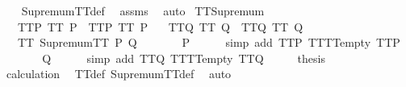 \begin{isabellebody}
%
\isadelimproof
\ \ %
\endisadelimproof
%
\isatagproof
{}\isamarkupfalse%
\ SupremumTT{\isacharunderscore}def\ \isamarkupfalse%
\ assms\ \isamarkupfalse%
\ auto%
\endisatagproof
{\isafoldproof}%
%
\isadelimproof
\isanewline
%
\endisadelimproof
\isanewline
{}\isamarkupfalse%
\ TT{}{\isacharunderscore}Supremum{\isacharcolon}\isanewline
\ \ \ TT{}{\isacharunderscore}P{\isacharcolon}\ {\isachardoublequoteopen}TT{}\ P{\isachardoublequoteclose}\ \ TT{}{\isacharunderscore}P{\isacharcolon}\ {\isachardoublequoteopen}TT{}\ P{\isachardoublequoteclose}\isanewline
\ \ \ TT{}{\isacharunderscore}Q{\isacharcolon}\ {\isachardoublequoteopen}TT{}\ Q{\isachardoublequoteclose}\ \ TT{}{\isacharunderscore}Q{\isacharcolon}\ {\isachardoublequoteopen}TT{}\ Q{\isachardoublequoteclose}\isanewline
\ \ \ {\isachardoublequoteopen}TT{}\ {\isacharparenleft}SupremumTT\ P\ Q{\isacharparenright}{\isachardoublequoteclose}\isanewline
%
\isadelimproof
%
\endisadelimproof
%
\isatagproof
{}\isamarkupfalse%
\ {\isacharminus}\isanewline
\ \ \isamarkupfalse%
\ {\isachardoublequoteopen}{\isacharbrackleft}{\isacharbrackright}\ {\isasymin}\ P{\isachardoublequoteclose}\isanewline
\ \ \ \ \isamarkupfalse%
\ {\isacharparenleft}simp\ add{\isacharcolon}\ TT{}{\isacharunderscore}P\ TT{}{\isacharunderscore}TT{}{\isacharunderscore}empty\ TT{}{\isacharunderscore}P{\isacharparenright}\isanewline
\ \ \isamarkupfalse%
\ \isamarkupfalse%
\ {\isachardoublequoteopen}{\isacharbrackleft}{\isacharbrackright}\ {\isasymin}\ Q{\isachardoublequoteclose}\isanewline
\ \ \ \ \isamarkupfalse%
\ {\isacharparenleft}simp\ add{\isacharcolon}\ TT{}{\isacharunderscore}Q\ TT{}{\isacharunderscore}TT{}{\isacharunderscore}empty\ TT{}{\isacharunderscore}Q{\isacharparenright}\isanewline
\ \ \isamarkupfalse%
\ \isamarkupfalse%
\ {\isacharquery}thesis\isanewline
\ \ \ \ \isamarkupfalse%
\ calculation\ \isamarkupfalse%
\ TT{}{\isacharunderscore}def\ SupremumTT{\isacharunderscore}def\ \isamarkupfalse%
\ auto\isanewline
{}\isamarkupfalse%
%
\endisatagproof
{\isafoldproof}%

\end{isabellebody}

